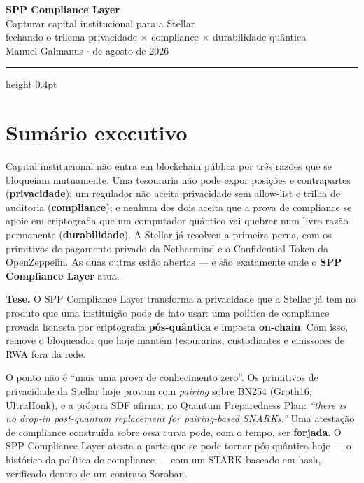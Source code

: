 \documentclass[11pt]{article}
\newcommand{\keybox}[1]{%
  \par\vspace{0.6em}%
  \noindent\colorbox{soft}{\parbox{\dimexpr\linewidth-2\fboxsep}{%
  \vspace{0.3em}\small #1\vspace{0.3em}}}%
  \par\vspace{0.6em}%
}
\begin{document}
\begin{center}
{\LARGE\bfseries\color{ink} SPP Compliance Layer}\\[0.4em]
{\large\color{klein} Capturar capital institucional para a Stellar}\\[0.2em]
{\normalsize\color{ink} fechando o trilema privacidade $\times$ compliance $\times$ durabilidade quântica}\\[1.2em]
{\small Manuel Galmanus \quad$\cdot$ de agosto de 2026}
\end{center}

\vspace{0.6em}
\hrule height 0.4pt
\vspace{1.2em}

\section*{Sumário executivo}

Capital institucional não entra em blockchain pública por três razões que se
bloqueiam mutuamente. Uma tesouraria não pode expor posições e contrapartes
(\textbf{privacidade}); um regulador não aceita privacidade sem allow-list e
trilha de auditoria (\textbf{compliance}); e nenhum dos dois aceita que a prova de
compliance se apoie em criptografia que um computador quântico vai quebrar num
livro-razão permanente (\textbf{durabilidade}). A Stellar já resolveu a primeira
perna, com os primitivos de pagamento privado da Nethermind e o Confidential Token
da OpenZeppelin. As duas outras estão abertas --- e são exatamente onde o
\textbf{SPP Compliance Layer} atua.

\keybox{\textbf{Tese.} O SPP Compliance Layer transforma a privacidade que a
Stellar já tem no produto que uma instituição pode de fato usar: uma política de
compliance provada honesta por criptografia \textbf{pós-quântica} e imposta
\textbf{on-chain}. Com isso, remove o bloqueador que hoje mantém tesourarias,
custodiantes e emissores de RWA fora da rede.}

O ponto não é ``mais uma prova de conhecimento zero''. Os primitivos de
privacidade da Stellar hoje provam com \emph{pairing} sobre BN254 (Groth16,
UltraHonk), e a própria SDF afirma, no Quantum Preparedness Plan:
\emph{``there is no drop-in post-quantum replacement for pairing-based SNARKs.''}
Uma atestação de compliance construída sobre essa curva pode, com o tempo, ser
\textbf{forjada}. O SPP Compliance Layer atesta a parte que se pode tornar
pós-quântica hoje --- o histórico da política de compliance --- com um STARK
baseado em hash, verificado dentro de um contrato Soroban.
\end{document}
